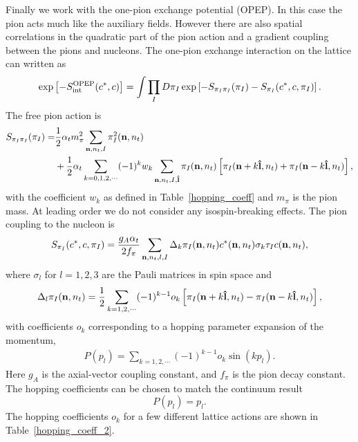 Finally we work with the one-pion exchange potential (OPEP).  In this case
the pion acts much like the auxiliary fields.  However there are also spatial
correlations in the quadratic part of the pion action and a gradient coupling
between the pions and nucleons.
 The one-pion exchange interaction on the lattice can written as
\begin{equation}
\exp\left[-S^{\rm OPEP}_{\rm int}(c^*,c)\right] = \int \prod_I D\pi_I
\exp\left[-S_{\pi_I\pi_I}(\pi_I) - S_{\pi_I}(c^*,c,\pi_{I})\right].
\end{equation}
The free pion action is
\begin{align}
S_{\pi_I\pi_I}(\pi_I)= & \frac{1}{2}\alpha_{t}m^2_{\pi} \sum_{{\bf n},n_t,I}\pi^2_{I}({\bf
n},n_t) \\
& +\frac{1}{2}\alpha_{t}%
\sum_{k=0,1,2,\cdots}(-1)^k w_k \sum_{{\bf n},n_t,I,{\bf \hat{l}}} \pi_{I}({\bf
n},n_t)
\left[ \pi_{I}({\bf n}+k{\bf \hat{l}},n_t) + \pi_{I}({\bf n}-k{\bf \hat{l}},n_t)
\right],
\end{align}
with the coefficient $w_k$ as defined in Table~\ref{hopping_coeff} and $m_{\pi}$ is the pion mass.  At leading order we do not
consider any isospin-breaking effects.  The pion coupling to the nucleon is\begin{align}
S_{\pi_I}(c^*,c,\pi_{I}) = \frac{g_A \alpha_t}{2 f_{\pi}} \sum_{{\bf n},n_t,l,I}
\Delta_k \pi_{I}({\bf
n},n_t)c^{\ast}({\bf
n},n_t)\sigma_k\tau_Ic({\bf n},n_t),  
\end{align}
where $\sigma_l$ for $l=1,2,3$ are the Pauli matrices in spin space and 
\begin{equation}
\Delta_l \pi_{I}({\bf
n},n_t)=\frac{1}{2}\sum_{k=1,2,\cdots} (-1)^{k-1} o_k \left[  \pi_{I}({\bf
n}+k{\bf \hat{l}},n_t) - \pi_{I}({\bf
n}-k{\bf \hat{l}},n_t)\right],
\end{equation}
with coefficients $o_k$ corresponding to a hopping parameter expansion of the
momentum,
\begin{align}
P(p_l)=\sum_{k=1,2,\cdots}%
(-1)^{k-1} o_{k}\sin\left(kp_{l}\right).
\end{align}
Here
$g_A$ is the axial-vector coupling constant, and $f_{\pi}$ is the pion
decay constant.  The hopping coefficients can be chosen to match the continuum result
\begin{equation}
P(p_l)= p_l.
\end{equation}
The hopping coefficients $o_k$ for a few different lattice actions are shown
in Table~\ref{hopping_coeff_2}.
